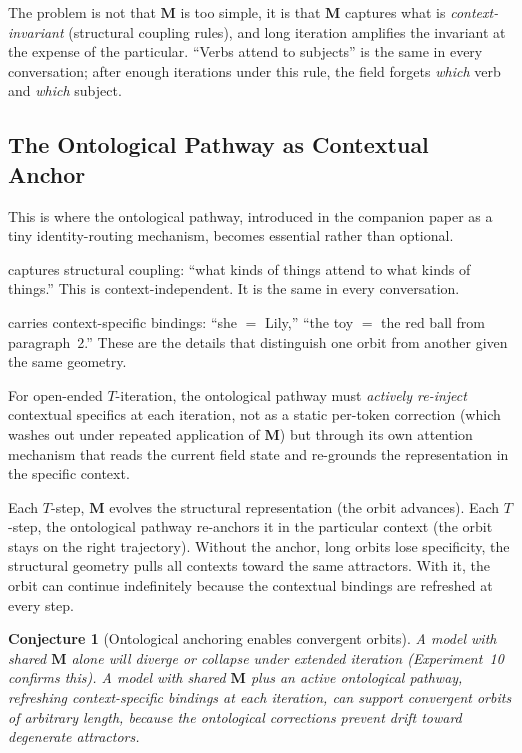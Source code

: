 \documentclass[11pt, a4paper]{article}
\newcommand{\M}{\mathbf{M}}
\theoremstyle{plain}
\newtheorem{conjecture}{Conjecture}
\theoremstyle{definition}
\theoremstyle{remark}
\begin{document}
The problem is not that $\M$ is too simple, it is that $\M$ captures what is \emph{context-invariant} (structural coupling rules), and long iteration amplifies the invariant at the expense of the particular.
``Verbs attend to subjects'' is the same in every conversation; after enough iterations under this rule, the field forgets \emph{which} verb and \emph{which} subject.

\subsection{The Ontological Pathway as Contextual Anchor}

This is where the ontological pathway, introduced in the companion paper as a tiny identity-routing mechanism, becomes essential rather than optional.

\begin{description}[nosep, leftmargin=1.5em]
    \item[$\M$ (orbital pathway)] captures structural coupling: ``what kinds of things attend to what kinds of things.''
    This is context-independent.
    It is the same in every conversation.

    \item[The ontological pathway] carries context-specific bindings: ``she $=$ Lily,'' ``the toy $=$ the red ball from paragraph~2.''
    These are the details that distinguish one orbit from another given the same geometry.
\end{description}

For open-ended $T$-iteration, the ontological pathway must \emph{actively re-inject} contextual specifics at each iteration, not as a static per-token correction (which washes out under repeated application of $\M$) but through its own attention mechanism that reads the current field state and re-grounds the representation in the specific context.

Each $T$-step, $\M$ evolves the structural representation (the orbit advances).
Each $T$-step, the ontological pathway re-anchors it in the particular context (the orbit stays on the right trajectory).
Without the anchor, long orbits lose specificity, the structural geometry pulls all contexts toward the same attractors.
With it, the orbit can continue indefinitely because the contextual bindings are refreshed at every step.

\begin{conjecture}[Ontological anchoring enables convergent orbits]
A model with shared $\M$ alone will diverge or collapse under extended iteration (Experiment~10 confirms this).
A model with shared $\M$ plus an active ontological pathway, refreshing context-specific bindings at each iteration, can support convergent orbits of arbitrary length, because the ontological corrections prevent drift toward degenerate attractors.
\end{conjecture}
\end{document}
